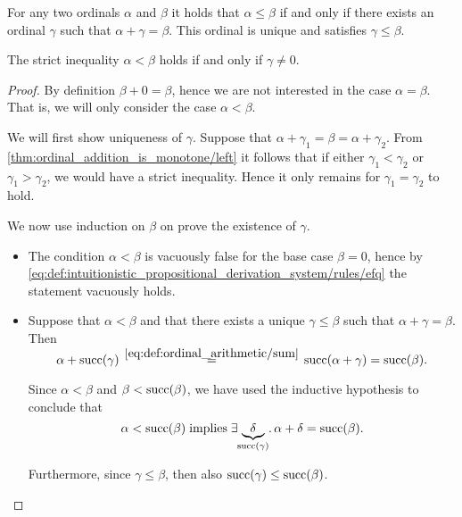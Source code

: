 \begin{proposition}\label{thm:ordinal_ordering_via_addition}
  For any two ordinals \( \alpha \) and \( \beta \) it holds that \( \alpha \leq \beta \) if and only if there exists an ordinal \( \gamma \) such that \( \alpha + \gamma = \beta \). This ordinal is unique and satisfies \( \gamma \leq \beta \).

  The strict inequality \( \alpha < \beta \) holds if and only if \( \gamma \neq 0 \).
\end{proposition}
\begin{proof}
  \SufficiencySubProof By definition \( \beta + 0 = \beta \), hence we are not interested in the case \( \alpha = \beta \). That is, we will only consider the case \( \alpha < \beta \).

  We will first show uniqueness of \( \gamma \). Suppose that \( \alpha + \gamma_1 = \beta = \alpha + \gamma_2 \). From \eqref{thm:ordinal_addition_is_monotone/left} it follows that if either \( \gamma_1 < \gamma_2 \) or \( \gamma_1 > \gamma_2 \), we would have a strict inequality. Hence it only remains for \( \gamma_1 = \gamma_2 \) to hold.

  We now use induction on \( \beta \) on prove the existence of \( \gamma \).
  \begin{itemize}
    \item The condition \( \alpha < \beta \) is vacuously false for the base case \( \beta = 0 \), hence by \eqref{eq:def:intuitionistic_propositional_derivation_system/rules/efq} the statement vacuously holds.

    \item Suppose that \( \alpha < \beta \) and that there exists a unique \( \gamma \leq \beta \) such that \( \alpha + \gamma = \beta \). Then
    \begin{equation*}
      \alpha + \op{succ}(\gamma)
      \reloset {\eqref{eq:def:ordinal_arithmetic/sum}} =
      \op{succ}(\alpha + \gamma)
      =
      \op{succ}(\beta).
    \end{equation*}

    Since \( \alpha < \beta \) and \( \beta < \operatorname{succ}(\beta) \), we have used the inductive hypothesis to conclude that
    \begin{equation*}
      \alpha < \op{succ}(\beta) \T{implies} \qexists {\underbrace{\delta}_{\mathclap{\op{succ}(\gamma)}}} \alpha + \delta = \op{succ}(\beta).
    \end{equation*}

    Furthermore, since \( \gamma \leq \beta \), then also \( \operatorname{succ}(\gamma) \leq \operatorname{succ}(\beta) \).


\end{itemize}
\end{proof}
